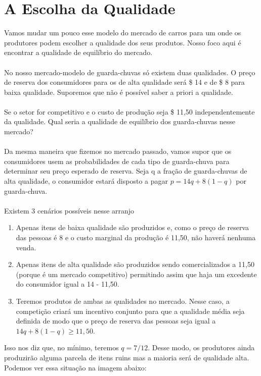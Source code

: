 \documentclass[a4paper,11pt,oneside]{book}
\theoremstyle{definition}
\theoremstyle{break}
\begin{document}
\section{A Escolha da Qualidade}

Vamos mudar um pouco esse modelo do mercado de carros para um onde os produtores podem escolher a qualidade dos seus produtos. Nosso foco aqui é encontrar a qualidade de equilíbrio do mercado.
\\~\\
No nosso mercado-modelo de guarda-chuvas só existem duas qualidades. O preço de reserva dos consumidores para os de alta qualidade será \$ 14 e de \$ 8 para baixa qualidade. Suporemos que não é possível saber a priori a qualidade.
\\~\\
Se o setor for competitivo e o custo de produção seja \$ 11,50 independentemente da qualidade. Qual seria a qualidade de equilíbrio dos guarda-chuvas nesse mercado?
\\~\\
Da mesma maneira que fizemos no mercado passado, vamos supor que os consumidores usem as probabilidades de cada tipo de guarda-chuva para determinar seu preço esperado de reserva. Seja q a fração de guarda-chuvas de alta qualidade, o consumidor estará disposto a pagar $p = 14q + 8(1 - q)$ por guarda-chuva.
\\~\\
Existem 3 cenários possíveis nesse arranjo
\begin{enumerate}
	\item Apenas itens de baixa qualidade são produzidos e, como o preço de reserva das pessoas é 8 e o custo marginal da produção é 11,50, não haverá nenhuma venda.
	\item Apenas itens de alta qualidade são produzidos sendo comercializados a 11,50 (porque é um mercado competitivo) permitindo assim que haja um excedente do consumidor igual a 14 - 11,50.
	\item Teremos produtos de ambas as qualidades no mercado. Nesse caso, a competição criará um incentivo conjunto para que a qualidade média seja definida de modo que o preço de reserva das pessoas seja igual a $14q + 8(1 - q) \geq 11,50$.
\end{enumerate}

Isso nos diz que, no mínimo, teremos $q = 7/12$. Desse modo, os produtores ainda produzirão alguma parcela de itens ruins mas a maioria será de qualidade alta. Podemos ver essa situação na imagem abaixo:
\end{document}
